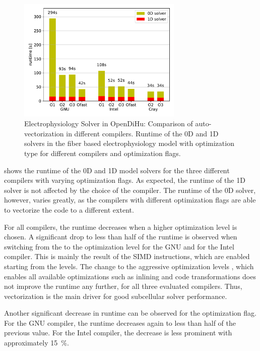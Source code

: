 \begin{figure}
  \centering%
  \includegraphics[width=0.7\textwidth]{images/results/studies/compilers.pdf}%
  \caption{Electrophysiology Solver in OpenDiHu: Comparison of auto-vectorization in different compilers. Runtime of the 0D and 1D solvers in the fiber based electrophysiology model with  optimization type for different compilers and optimization flags.}%
  \label{fig:compilers}%
\end{figure}%

 shows the runtime of the 0D and 1D model solvers for the three different compilers with varying optimization flags.
As expected, the runtime of the 1D solver is not affected by the choice of the compiler. The runtime of the 0D solver, however, varies greatly, as the compilers with different optimization flags are able to vectorize the code to a different extent.

For all compilers, the runtime decreases when a higher optimization level is chosen. A significant drop to less than half of the runtime is observed when switching from the  to the  optimization level for the GNU and for the Intel compiler. This is mainly the result of the SIMD instructions, which are enabled starting from the  levels.
The change to the aggressive optimization levels , which enables all available optimizations such as inlining and code transformations does not improve the runtime any further, for all three evaluated compilers. Thus, vectorization is the main driver for good subcellular solver performance.

Another significant decrease in runtime can be observed for the  optimization flag. For the GNU compiler, the runtime decreases again to less than half of the previous value. For the Intel compiler, the decrease is less prominent with approximately \SI{15}{\percent}. 

